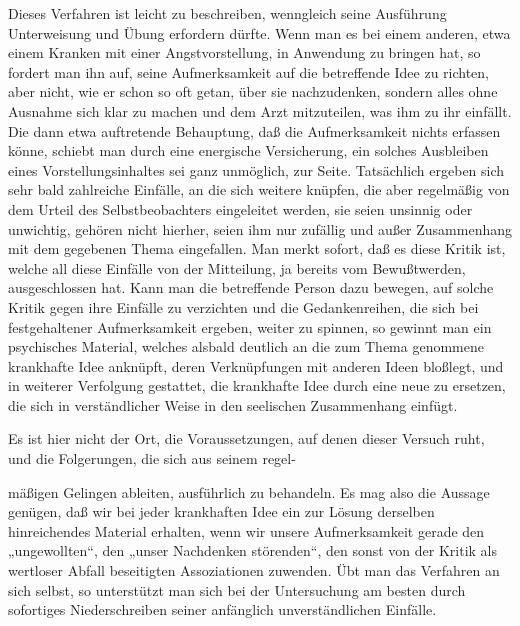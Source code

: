\documentclass[twoside=true,titlepage=false,open=any, parskip=never, fontsize=10pt, headings=small, chapterprefix=false, appendixprefix=false]{scrbook}
\begin{document}
            
        \pstart
        Dieses Verfahren ist leicht zu beschreiben, wenngleich seine Ausführung
               Unterweisung und Übung erfordern dürfte. Wenn man es bei einem anderen, etwa
               einem Kranken mit einer Angstvorstellung, in Anwendung zu bringen
               hat, so fordert man ihn auf, seine Aufmerksamkeit auf die betreffende Idee zu
               richten, aber nicht, wie er schon so oft getan, über sie nachzudenken,
               sondern alles ohne Ausnahme sich klar zu machen und
               dem Arzt mitzuteilen, was ihm zu ihr einfällt.
               Die dann etwa auftretende Behauptung, daß die Aufmerksamkeit nichts
               erfassen könne, schiebt man durch eine energische Versicherung, ein solches
               Ausbleiben eines Vorstellungsinhaltes sei ganz unmöglich, zur Seite. Tatsächlich
               ergeben sich sehr bald zahlreiche Einfälle, an die sich weitere knüpfen, die
               aber regelmäßig von dem Urteil des Selbstbeobachters eingeleitet werden, sie
               seien unsinnig oder unwichtig, gehören nicht hierher, seien ihm nur zufällig
               und außer Zusammenhang mit dem gegebenen Thema eingefallen. Man merkt
               sofort, daß es diese Kritik ist, welche all diese
               Einfälle von der Mitteilung, ja bereits vom Bewußtwerden, ausgeschlossen
               hat. Kann man die betreffende Person dazu bewegen, auf solche Kritik gegen ihre
               Einfälle zu verzichten und die Gedankenreihen, die sich bei festgehaltener
               Aufmerksamkeit ergeben, weiter zu spinnen, so gewinnt man ein psychisches
               Material, welches alsbald deutlich an die zum Thema genommene krankhafte Idee
               anknüpft, deren Verknüpfungen mit anderen Ideen bloßlegt, und in weiterer
               Verfolgung gestattet, die krankhafte Idee durch eine neue zu ersetzen, die sich
               in verständlicher Weise in den seelischen Zusammenhang einfügt.
        \pend
    
            
        \pstart
        Es ist hier nicht der Ort, die Voraussetzungen, auf denen dieser Versuch ruht,
               und die Folgerungen, die sich aus seinem regel-
        \pend
    
         
            
            
            
        \pstart
        mäßigen Gelingen ableiten, ausführlich zu behandeln. Es mag also die
               Aussage genügen, daß wir bei jeder krankhaften Idee ein zur Lösung derselben
               hinreichendes Material erhalten, wenn wir unsere Aufmerksamkeit gerade den „ungewollten“, den „unser Nachdenken störenden“, den sonst von der Kritik als wertloser
               Abfall beseitigten Assoziationen zuwenden. Übt man das Verfahren an sich selbst,
               so unterstützt man sich bei der Untersuchung am besten durch sofortiges
               Niederschreiben seiner anfänglich unverständlichen Einfälle.
        \pend
    
\end{document}
